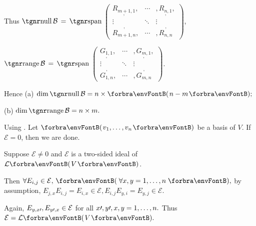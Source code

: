 \documentclass[a4paper, 11pt, UTF8]{article}
\begin{document}
\begin{large}
Thus $\null\mathcal{B}\,=\,\Spn${\normalsize$\begin{pmatrix} \underset{,}{R_{m+1,1}}, & \cdots & ,\underset{,}{R_{n,1}},\\ \vdots & \ddots & \vdots\\ \overset{,}{R_{m+1,n}}, & \cdots & ,\overset{,}{R_{n,n}}\end{pmatrix}$},\par\qquad\quad\!$\range\mathcal{B}\,=\,\Spn${\normalsize$\begin{pmatrix} \underset{,}{G_{1,1}}, & \cdots & ,\underset{,}{G_{m,1}},\\ \vdots & \ddots & \vdots\\ \overset{,}{G_{1,n}}, & \cdots & ,\overset{,}{G_{m,n}}\end{pmatrix}$}.\vspace{-37pt}\par\hspace{230pt}
Hence (a) $\dim\null\mathcal{B}=n\times\Par{n-m};$\par\hspace{266pt} (b) $\dim\range\mathcal{B}=n\times m.$\PfEnd
\SepLine

Using \NOTEFOR\;[3.60]. Let $\Par{v_1,\dots,v_n}$ be a basis of $V$. If $\mathcal{E}=0$, then we are done.\par\quad Suppose $\mathcal{E}\neq 0$ and $\mathcal{E}$ is a two-sided ideal of $\Lm{V}$.\vspace{3pt}\par\quad
Then {\Large$\forall E_{i,j}\in\mathcal{E},\,\Par{\,\forall x,y=1,\dots,n\,},$} by assumption, {\Large\vspace{3pt}$E_{j,x}E_{i,j}=E_{i,x}\in\mathcal{E},E_{i,j}E_{y,i}=E_{y,j}\in\mathcal{E}.$}\par\quad
Again, {\Large$E_{y,x\prime},E_{y\prime,x}\in\mathcal{E}$} for all $x\prime,y\prime,x,y=1,\dots,n.$ Thus $\mathcal{E}=\Lm{V}.$\PfEnd
\SepLine


\end{large}
\end{document}
